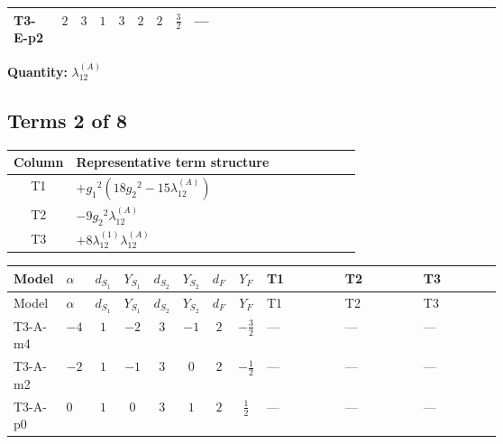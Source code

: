 \documentclass[8pt]{article}
\begin{document}
\begin{landscape}
\begin{longtable}{@{}llcccccc >{\raggedright\arraybackslash}p{0.21\linewidth} >{\raggedright\arraybackslash}p{0.21\linewidth} >{\raggedright\arraybackslash}p{0.21\linewidth}@{}}
\midrule
T3-E-p2 & $2$ & $3$ & $1$ & $3$ & $2$ & $2$ & $\frac{3}{2}$ & --- & \scriptsize\adjustbox{max width=\linewidth}{$\begin{gathered} +\frac{2}{3} \operatorname{Tr}\!\left({y_1}\,\left({y_1}\right)^{\dagger}\,{y_2}\,\left({y_2}\right)^{\dagger}\right)\end{gathered}$} & \scriptsize\adjustbox{max width=\linewidth}{$\begin{gathered} -\frac{2}{9} {\lambda_5} \left({\lambda_5}\right)^{*}\end{gathered}$} \\
\midrule
\bottomrule
\end{longtable}
\clearpage
\noindent\textbf{Quantity: }$\lambda_{12}^{(A)}$\par\smallskip
\subsection*{Terms 2 of 8}
\begin{center}
\begin{tabular}{@{}c >{\raggedright\arraybackslash}p{0.82\linewidth}@{}}
\toprule
Column & Representative term structure \\
\midrule
T1 & \(\displaystyle +{g_1}^2 \left(18 {g_2}^2-15 {\lambda_{12}^{(A)}}\right)\) \\
\midrule
T2 & \(\displaystyle -9 {g_2}^2 {\lambda_{12}^{(A)}}\) \\
\midrule
T3 & \(\displaystyle +8 {\lambda_{12}^{(1)}} {\lambda_{12}^{(A)}}\) \\
\midrule
\bottomrule
\end{tabular}
\end{center}
\smallskip
\tiny
\begin{longtable}{@{}llcccccc >{\raggedright\arraybackslash}p{0.21\linewidth} >{\raggedright\arraybackslash}p{0.21\linewidth} >{\raggedright\arraybackslash}p{0.21\linewidth}@{}}
\toprule
Model & $\alpha$ & $d_{S_1}$ & $Y_{S_1}$ & $d_{S_2}$ & $Y_{S_2}$ & $d_F$ & $Y_F$ & T1 & T2 & T3 \\
\midrule
\endfirsthead
\toprule
Model & $\alpha$ & $d_{S_1}$ & $Y_{S_1}$ & $d_{S_2}$ & $Y_{S_2}$ & $d_F$ & $Y_F$ & T1 & T2 & T3 \\
\midrule
\endhead
T3-A-m4 & $-4$ & $1$ & $-2$ & $3$ & $-1$ & $2$ & $-\frac{3}{2}$ & --- & --- & --- \\
\midrule
T3-A-m2 & $-2$ & $1$ & $-1$ & $3$ & $0$ & $2$ & $-\frac{1}{2}$ & --- & --- & --- \\
\midrule
T3-A-p0 & $0$ & $1$ & $0$ & $3$ & $1$ & $2$ & $\frac{1}{2}$ & --- & --- & --- \\

\end{longtable}
\end{landscape}
\end{document}
